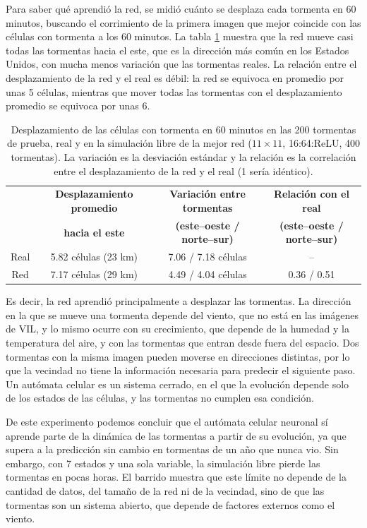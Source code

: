 Para saber qué aprendió la red, se midió cuánto se desplaza cada tormenta en 60 minutos, buscando el corrimiento de la primera imagen que mejor coincide con las células con tormenta a los 60 minutos. La tabla \ref{tab:sevir_desplazamiento} muestra que la red mueve casi todas las tormentas hacia el este, que es la dirección más común en los Estados Unidos, con mucha menos variación que las tormentas reales. La relación entre el desplazamiento de la red y el real es débil: la red se equivoca en promedio por unas 5 células, mientras que mover todas las tormentas con el desplazamiento promedio se equivoca por unas 6.

\begin{table}[htbp]
	\centering
	\footnotesize
	\setlength{\tabcolsep}{2pt}
	\begin{tabular}{@{}cccc@{}}
		\toprule
		& \textbf{Desplazamiento promedio} & \textbf{Variación entre tormentas} & \textbf{Relación con el real} \\
		& \textbf{hacia el este} & \textbf{(este--oeste / norte--sur)} & \textbf{(este--oeste / norte--sur)} \\ \midrule
		Real & 5.82 células (23 km) & 7.06 / 7.18 células & -- \\
		Red & 7.17 células (29 km) & 4.49 / 4.04 células & 0.36 / 0.51 \\
		\bottomrule
	\end{tabular}
	\caption{Desplazamiento de las células con tormenta en 60 minutos en las 200 tormentas de prueba, real y en la simulación libre de la mejor red ($11 \times 11$, 16:64:ReLU, 400 tormentas). La variación es la desviación estándar y la relación es la correlación entre el desplazamiento de la red y el real (1 sería idéntico).}
	\label{tab:sevir_desplazamiento}
\end{table}

Es decir, la red aprendió principalmente a desplazar las tormentas. La dirección en la que se mueve una tormenta depende del viento, que no está en las imágenes de VIL, y lo mismo ocurre con su crecimiento, que depende de la humedad y la temperatura del aire, y con las tormentas que entran desde fuera del espacio. Dos tormentas con la misma imagen pueden moverse en direcciones distintas, por lo que la vecindad no tiene la información necesaria para predecir el siguiente paso. Un autómata celular es un sistema cerrado, en el que la evolución depende solo de los estados de las células, y las tormentas no cumplen esa condición.

De este experimento podemos concluir que el autómata celular neuronal sí aprende parte de la dinámica de las tormentas a partir de su evolución, ya que supera a la predicción sin cambio en tormentas de un año que nunca vio. Sin embargo, con 7 estados y una sola variable, la simulación libre pierde las tormentas en pocas horas. El barrido muestra que este límite no depende de la cantidad de datos, del tamaño de la red ni de la vecindad, sino de que las tormentas son un sistema abierto, que depende de factores externos como el viento.
